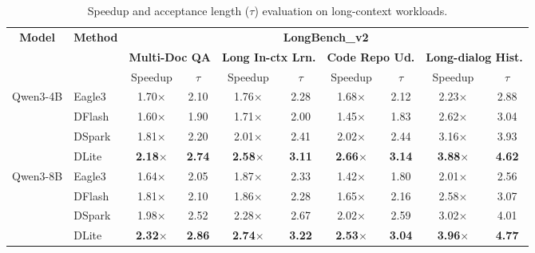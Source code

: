 \begin{table}[!t]
\centering
\vspace{-10pt}
\caption{Speedup and acceptance length ($\tau$) evaluation on long-context workloads.}
\label{tab:longbench_v2_models}
\small
\renewcommand{\arraystretch}{1.1}
\setlength{\tabcolsep}{5.8pt} %
\begin{tabular}{c l cc cc cc cc}
\toprule
\multirow{3}{*}{\textbf{Model}} & \multirow{3}{*}{\textbf{Method}} & \multicolumn{8}{c}{\textbf{LongBench\_v2}} \\
\cmidrule(lr){3-10}
& & \multicolumn{2}{c}{\textbf{Multi-Doc QA}} & \multicolumn{2}{c}{\textbf{Long In-ctx Lrn.}} & \multicolumn{2}{c}{\textbf{Code Repo Ud.}} & \multicolumn{2}{c}{\textbf{Long-dialog Hist.}} \\
\cmidrule(lr){3-4} \cmidrule(lr){5-6} \cmidrule(lr){7-8} \cmidrule(lr){9-10}
& & Speedup & $\tau$ & Speedup & $\tau$ & Speedup & $\tau$ & Speedup & $\tau$ \\
\midrule

\multirow{4}{*}{Qwen3-4B} 
& Eagle3      & 1.70$\times$ & 2.10  & 1.76$\times$  & 2.28   & 1.68$\times$  & 2.12 & 2.23$\times$  & 2.88   \\
& DFlash     & 1.60$\times$  & 1.90 & 1.71$\times$ & 2.00 & 1.45$\times$ & 1.83 & 2.62$\times$ & 3.04 \\
& DSpark     & 1.81$\times$ & 2.20 & 2.01$\times$ & 2.41 & 2.02$\times$ & 2.44 & 3.16$\times$ & 3.93 \\
& DLite & \textbf{2.18$\times$} & \textbf{2.74} & \textbf{2.58$\times$} & \textbf{3.11} & \textbf{2.66$\times$} & \textbf{3.14} & \textbf{3.88$\times$} & \textbf{4.62} \\

\midrule

\multirow{4}{*}{Qwen3-8B}
& Eagle3      & 1.64$\times$ & 2.05 & 1.87$\times$ & 2.33 & 1.42$\times$  & 1.80 & 2.01$\times$  & 2.56 \\
& DFlash     & 1.81$\times$  & 2.10 & 1.86$\times$ & 2.28 & 1.65$\times$  & 2.16 & 2.58$\times$  & 3.07 \\
& DSpark     & 1.98$\times$  & 2.52 & 2.28$\times$ & 2.67 & 2.02$\times$  & 2.59 & 3.02$\times$  & 4.01 \\
& DLite & \textbf{2.32$\times$} & \textbf{2.86} & \textbf{2.74$\times$} & \textbf{3.22} & \textbf{2.53$\times$} & \textbf{3.04} & \textbf{3.96$\times$} & \textbf{4.77} \\ 
\bottomrule
\end{tabular}
\end{table}

